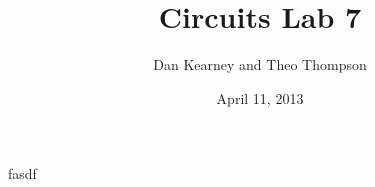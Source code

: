 \documentclass{article}
\title{Circuits Lab 7}
\author{Dan Kearney and Theo Thompson}
\date{April 11, 2013}
\begin{document}
\maketitle

fasdf
\end{document}
